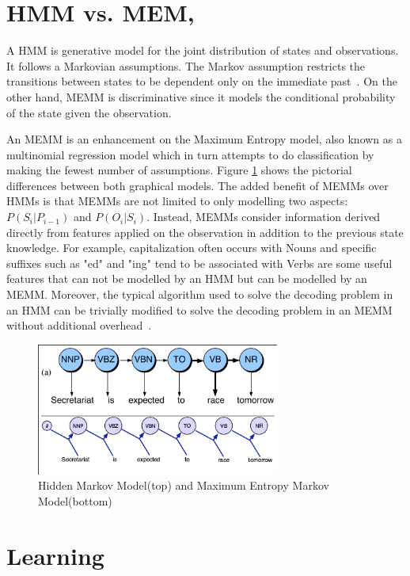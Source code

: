 \documentclass{acm_proc_article-sp}
\begin{document}
\section{HMM vs. MEM,}
A HMM is generative model for the joint distribution of states and observations. It follows a Markovian assumptions. The Markov assumption restricts the transitions between states to be dependent only on the immediate past~\cite{nlpBook}. On the other hand, MEMM is discriminative since it models the conditional probability of the state given the observation. 

An MEMM is an enhancement on the Maximum Entropy model, also known as a multinomial regression model which in turn attempts to do classification by making the fewest number of assumptions. Figure \ref{hmmVmemm} shows the pictorial differences between both graphical models. The added benefit of MEMMs over HMMs is that MEMMs are not limited to only modelling two aspects: $P( S_i | P_{i-1} )$ and $P( O_i | S_i )$. Instead, MEMMs consider information derived directly from features applied on the observation in addition to the previous state knowledge. For example, capitalization often occurs with Nouns and specific suffixes such as "ed" and "ing" tend to be associated with Verbs are some useful features that can not be modelled by an HMM but can be modelled by an MEMM. Moreover, the typical algorithm used to solve the decoding problem in an HMM can be trivially modified to solve the decoding problem in an MEMM without additional overhead~\cite{nlpBook}.
\begin{figure}[ht]
\centering
\includegraphics[width=80mm]{figures/memm.png}
\caption{Hidden Markov Model(top) and Maximum Entropy Markov Model(bottom)~\cite{nlpBook} \label{hmmVmemm}}
\end{figure}

\section{Learning}



\end{document}
